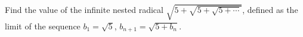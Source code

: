 Find the value of the infinite nested radical $\sqrt{5+\sqrt{5+\sqrt{5+\cdots}}}$, defined as the limit of the sequence $b_1=\sqrt5$, $b_{n+1}=\sqrt{5+b_n}$.
